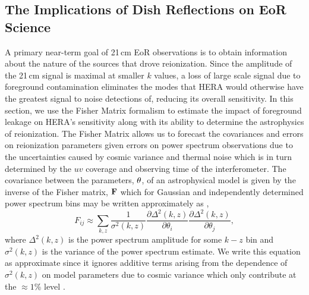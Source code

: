 \documentclass[twocolumn]{emulateapj}
\begin{document}
\subsection{The Implications of Dish Reflections on EoR Science}\label{ssec:Science}
A primary near-term goal of 21\,cm EoR observations is to obtain information about the nature of the sources that drove reionization. Since the amplitude of the 21\,cm signal is maximal at smaller $k$ values, a loss of large scale signal due to foreground contamination eliminates the modes that HERA would otherwise have the greatest signal to noise detections of, reducing its overall sensitivity. In this section, we use the Fisher Matrix formalism to estimate the impact of foreground leakage on HERA's sensitivity along with its ability to determine the astrophysics of reionization. The Fisher Matrix allows us to forecast the covariances and errors on reionization parameters given errors on power spectrum observations due to the uncertainties caused by cosmic variance and thermal noise which is in turn determined by the $uv$ coverage and observing time of the interferometer. The covariance between the parameters, ${\bf \theta}$, of an astrophysical model is given by the inverse of the Fisher matrix, ${\bf F}$ which for Gaussian and independently determined power spectrum bins may be written approximately as \citep{Pober:2014},
\begin{equation}\label{eq:Fisher}
F_{ij} \approx \sum_{k,z} \frac{1}{\sigma^2(k,z)} \frac{\partial \Delta^2(k,z)}{\partial \theta_i} \frac{\partial \Delta^2(k,z)}{\partial \theta_j},
\end{equation}
where $\Delta^2(k,z)$ is the power spectrum amplitude for some $k-z$ bin and $\sigma^2(k,z)$ is the variance of the power spectrum estimate. We write this equation as approximate since it ignores additive terms arising from the dependence of $\sigma^2(k,z)$ on model parameters due to cosmic variance which only contribute at the $\approx 1$\% level \citep{EwallWice:2015b}. 
\end{document}

